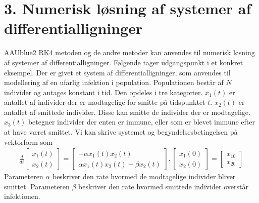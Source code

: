 \section*{3. Numerisk løsning af systemer af differentialligninger}
% 
%
\begin{color}{AAUblue2}
%
RK4 metoden og de andre metoder kan anvendes til numerisk løsning af systemer af differentialligninger. 
Følgende tager udgangspunkt i et konkret eksempel. Der er givet et system af differentialligninger, som anvendes til modellering af en ufarlig infektion i population. 
Populationen består af $N$ individer og antages konstant i tid. Den opdeles i tre kategorier. $x_1(t)$ er antallet af individer
der er modtagelige for smitte på tidspunktet $t$. $x_2(t)$ er antallet af smittede individer.
Disse kan smitte de individer der er modtagelige. 
$x_3(t)$ betegner individer der enten er immune, eller som er blevet immune efter at have været smittet.
%
%
%
Vi kan skrive systemet og begyndelsesbetingelsen på vektorform som
%
\begin{align*}
\frac{d}{dt} 
\begin{bmatrix}
x_1 (t) \\
x_2 (t) 
\end{bmatrix} = 
\begin{bmatrix}
- \alpha x_1 (t) x_2 (t) \\
\alpha x_1 (t) x_2 (t) - \beta x_2 (t) 
\end{bmatrix}
,
\begin{bmatrix}
x_1 (0) \\
x_2 (0) 
\end{bmatrix}
= 
\begin{bmatrix}
x_{10} \\
x_{20}
\end{bmatrix}
\end{align*}
%
Parameteren $\alpha$ beskriver den rate hvormed de modtagelige individer bliver smittet.
Parameteren $\beta$ beskriver den rate hvormed smittede individer overstår infektionen. 
% 
\end{color}
%



 
